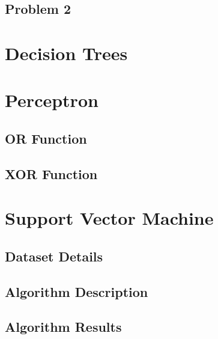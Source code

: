\documentclass{article}
\begin{document}
\subsection{Problem 2}





\section{Decision Trees}





\section{Perceptron}
\subsection{OR Function}
\subsection{XOR Function}



\section{Support Vector Machine}
\subsection{Dataset Details}
\subsection{Algorithm Description}
\subsection{Algorithm Results}
\end{document}
